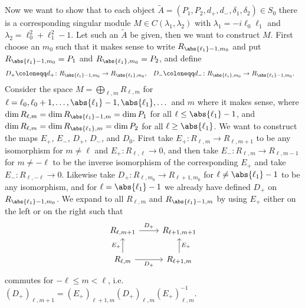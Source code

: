 Now we want to show that to each object $\widetilde{A}=(P_1,P_2,d_+,d_-,\delta_1,\delta_2)\in S_0$ there is a corresponding singular module $M\in C(\lambda_1,\lambda_2)$ with $\lambda_1=-i\ell_0\ell_1$ and $\lambda_2=\ell_0^2+\ell_1^2-1$. Let such an $\widetilde{A}$ be given, then we want to construct $M$. First choose an $m_0$ such that it makes sense to write $R_{\abs{\ell_1}-1,m_0}$ and put $R_{\abs{\ell_1}-1,m_0}=P_1$ and $R_{\abs{\ell_1},m_0}=P_2$, and define
\begin{align*}
  D_+\coloneqq d_+\colon R_{\abs{\ell_1}-1,m_0}&\to R_{\abs{\ell_1},m_0}, & D_-\coloneqq d_-\colon R_{\abs{\ell_1},m_0} &\to R_{\abs{\ell_1}-1,m_0}.
\end{align*}
Consider the space $M=\bigoplus_{\ell,m}R_{\ell,m}$ for $\ell=\ell_0,\ell_0+1,\dotsc,\abs{\ell_1}-1,\abs{\ell_1},\dotsc$ and $m$ where it makes sense, where $\dim R_{\ell,m}=\dim R_{\abs{\ell_1}-1,m}=\dim P_1$ for all $\ell\leq \abs{\ell_1}-1$, and $\dim R_{\ell,m}=\dim R_{\abs{\ell_1},m}=\dim P_2$ for all $\ell\geq \abs{\ell_1}$. We want to construct the maps $E_+$, $E_-$, $D_+$, $D_-$, and $D_0$. First take $E_+\colon R_{\ell,m}\to R_{\ell,m+1}$ to be any isomorphism for $m\neq \ell$ and $E_+\colon R_{\ell,\ell}\to 0$, and then take $E_-\colon R_{\ell,m}\to R_{\ell,m-1}$ for $m\neq -\ell$ to be the inverse isomorphism of the corresponding $E_+$ and take $E_-\colon R_{\ell,-\ell}\to 0$. Likewise take $D_+\colon R_{\ell,m_0}\to R_{\ell+1,m_0}$ for $\ell\neq \abs{\ell_1}-1$ to be any isomorphism, and for $\ell=\abs{\ell_1}-1$ we already have defined $D_+$ on $R_{\abs{\ell_1}-1,m_0}$. We expand to all $R_{\ell,m}$ and $R_{\abs{\ell_1}-1,m}$ by using $E_+$ either on the left or on the right such that
\[
  \begin{tikzcd}
    R_{\ell,m+1} \ar[r,"D_+"] & R_{\ell+1,m+1} \\
    R_{\ell,m}\ar[u,"E_+"] \ar[r,"D_+",swap] & R_{\ell+1,m}\ar[u,"E_+",swap]
  \end{tikzcd}
\]
commutes for $-\ell\leq m<\ell$, i.e.\ $(D_+)_{\ell,m+1}=(E_+)_{\ell+1,m} (D_+)_{\ell,m} (E_+)_{\ell,m}^{-1}$. 

